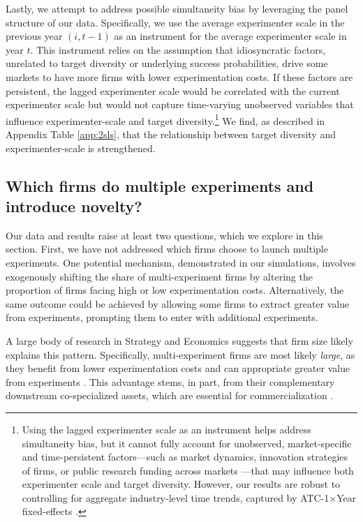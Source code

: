 Lastly, we attempt to address possible simultaneity bias by leveraging the panel structure of our data. Specifically, we use the average experimenter scale in the previous year $(i, t-1)$ as an instrument for the average experimenter scale in year $t$. This instrument relies on the assumption that idiosyncratic factors, unrelated to target diversity or underlying success probabilities, drive some markets to have more firms with lower experimentation costs. If these factors are persistent, the lagged experimenter scale would be correlated with the current experimenter scale but would not capture time-varying unobserved variables that influence experimenter-scale and target diversity.\footnote{Using the lagged experimenter scale as an instrument helps address simultaneity bias, but it cannot fully account for unobserved, market-specific and time-persistent factors---such as market dynamics, innovation strategies of firms, or public research funding across markets ---that may influence both experimenter scale and target diversity. However, our results are robust to controlling for aggregate industry-level time trends, captured by ATC-1$\times$Year fixed-effects  \citep{branstetter2022generic}.} We find, as described in Appendix Table \ref{app:2sls}, that the relationship between target diversity and experimenter-scale is strengthened.



\subsection{Which firms do multiple experiments and introduce novelty?}\label{subsec:which-firms}

Our data and results raise at least two questions, which we explore in this section. First, we have not addressed which firms choose to launch multiple experiments. One potential mechanism, demonstrated in our simulations, involves exogenously shifting the share of multi-experiment firms by altering the proportion of firms facing high or low experimentation costs. Alternatively, the same outcome could be achieved by allowing some firms to extract greater value from experiments, prompting them to enter with additional experiments.

A large body of research in Strategy and Economics suggests that firm size likely explains this pattern. Specifically, multi-experiment firms are most likely \emph{large}, as they benefit from lower experimentation costs \citep{cohen1996reprise} and can appropriate greater value from experiments \citep{arora2023invention}. This advantage stems, in part, from their complementary downstream co-specialized assets, which are essential for commercialization \citep[e.g.,][]{rosenbloom2000leadership, filippetti2017appropriability}.

